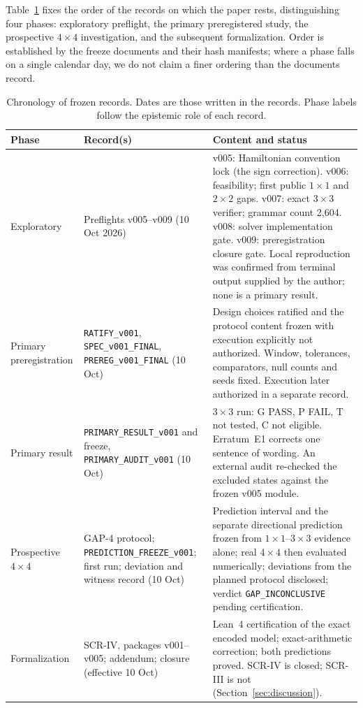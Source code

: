 \documentclass[11pt,a4paper]{article}
\theoremstyle{plain}
\theoremstyle{definition}
\theoremstyle{remark}
\newcommand{\lean}[1]{\nolinkurl{#1}}
\begin{document}
Table~\ref{tab:chron} fixes the order of the records on which the paper rests, distinguishing four phases: exploratory preflight, the primary preregistered study, the prospective $4\times4$ investigation, and the subsequent formalization. Order is established by the freeze documents and their hash manifests; where a phase falls on a single calendar day, we do not claim a finer ordering than the documents record.

\begin{table}[t]
\centering\small
\caption{Chronology of frozen records. Dates are those written in the records. Phase labels follow the epistemic role of each record.}
\label{tab:chron}
\begin{tabularx}{\linewidth}{@{}p{2.15cm}p{2.5cm}X@{}}
\toprule
Phase & Record(s) & Content and status\\
\midrule
Exploratory & Preflights v005--v009 (10 Oct 2026) & v005: Hamiltonian convention lock (the sign correction). v006: feasibility; first public $1\times1$ and $2\times2$ gaps. v007: exact $3\times3$ verifier; grammar count 2{,}604. v008: solver implementation gate. v009: preregistration closure gate. Local reproduction was confirmed from terminal output supplied by the author; none is a primary result.\\[0.4em]
Primary preregistration & \lean{RATIFY_v001}, \lean{SPEC_v001_FINAL}, \lean{PREREG_v001_FINAL} (10 Oct) & Design choices ratified and the protocol content frozen with execution explicitly not authorized. Window, tolerances, comparators, null counts and seeds fixed. Execution later authorized in a separate record.\\[0.4em]
Primary result & \lean{PRIMARY_RESULT_v001} and freeze, \lean{PRIMARY_AUDIT_v001} (10 Oct) & $3\times3$ run: G PASS, P FAIL, T not tested, C not eligible. Erratum~E1 corrects one sentence of wording. An external audit re-checked the excluded states against the frozen v005 module.\\[0.4em]
Prospective $4\times4$ & GAP-4 protocol; \lean{PREDICTION_FREEZE_v001}; first run; deviation and witness record (10 Oct) & Prediction interval and the separate directional prediction frozen from $1\times1$--$3\times3$ evidence alone; real $4\times4$ then evaluated numerically; deviations from the planned protocol disclosed; verdict \lean{GAP_INCONCLUSIVE} pending certification.\\[0.4em]
Formalization & SCR-IV, packages v001--v005; addendum; closure (effective 10 Oct) & Lean~4 certification of the exact encoded model; exact-arithmetic correction; both predictions proved. SCR-IV is closed; SCR-III is not (Section~\ref{sec:discussion}).\\
\bottomrule
\end{tabularx}
\end{table}
\end{document}
